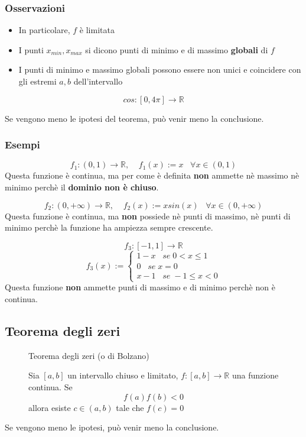 \documentclass[a4paper]{article}
\theoremstyle{break}
\theoremstyle{break}
\theoremstyle{break}
\theoremstyle{break}
\begin{document}
\subsubsection{Osservazioni}
\begin{itemize}
    \item In particolare, \( f \) è limitata
    \item I punti \( x_{min}, x_{max} \) si dicono punti di minimo e di massimo \textbf{globali} di \( f \) 
    \item I punti di minimo e massimo globali possono essere non unici e coincidere con gli estremi
        \( a,b \) dell'intervallo
\end{itemize}

\begin{example}
    \[
        cos: [0, 4 \pi] \to \mathbb{R}
    \] 
    \label{D2}
\end{example}
Se vengono meno le ipotesi del teorema, può venir meno la conclusione.
\subsubsection{Esempi}
\begin{example}
    \[
    f_1: (0,1) \to \mathbb{R},\;\;\;\; f_1(x):= x \;\;\; \forall x \in (0,1)
    \] 
    \label{D3}
    Questa funzione è continua, ma per come è definita \textbf{non} ammette nè massimo nè minimo perchè
    il \textbf{dominio non è chiuso}.
\end{example}
\begin{example}
    \[
    f_2: (0, +\infty) \to \mathbb{R},\;\;\;\; f_2(x):= x sin(x)\;\;\; \forall x \in (0, +\infty)
    \] 
    \label{D4}
    Questa funzione è continua, ma \textbf{non} possiede nè punti di massimo, nè punti di minimo perchè
    la funzione ha ampiezza sempre crescente.
\end{example}
\begin{example}
    \[
        f_3: [-1, 1] \to \mathbb{R}
    \] 
    \[
    f_3(x):=\begin{cases}
        1-x \;\;\; se\; 0 < x \le 1 \\
        0 \;\;\; se\; x = 0 \\
        x-1 \;\;\; se\; -1 \le x < 0
    \end{cases}
    \] 
    \label{D5}
    Questa funzione \textbf{non} ammette punti di massimo e di minimo perchè non è continua.
\end{example}
\subsection{Teorema degli zeri}
\begin{figure}[H]
    \begin{definition}
        Teorema degli zeri (o di Bolzano)

        Sia \( [a,b] \) un intervallo chiuso e limitato, \( f: [a,b] \to \mathbb{R} \) una funzione continua.
        Se
        \[
            f(a)f(b) < 0
        \] 
        allora esiste \( c \in (a,b) \) tale che \( f(c) = 0 \)  

        \label{D6}
    \end{definition}
\end{figure}
Se vengono meno le ipotesi, può venir meno la conclusione.
\end{document}
